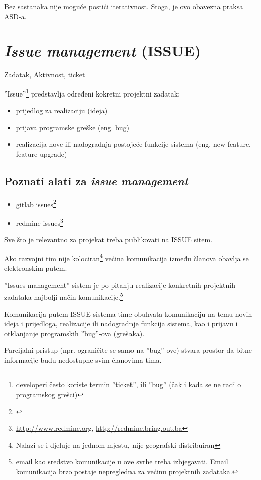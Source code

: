 \documentclass[lmodern, utf8, zavrsni]{fit}
\begin{document}
Bez sastanaka nije moguće postići iterativnost. Stoga, je ovo obavezna praksa ASD-a.

\section{\emph{Issue management} (ISSUE)}

Zadatak, Aktivnost, ticket

''Issue''\footnote{developeri često koriste termin ''ticket'', ili ''bug'' (čak i kada se ne radi o programskog grešci)} predstavlja određeni kokretni projektni zadatak:
\begin{itemize}
  \item prijedlog za realizaciju (ideja)
  \item prijava programske greške (eng. bug)
  \item realizacija nove ili nadogradnja postojeće funkcije sistema (eng. new feature, feature upgrade)
\end{itemize}

\subsection{Poznati alati za \emph{issue management}}

\begin{itemize}
  \item gitlab issues\footnote{\citep{agilegit}}
  \item redmine issues\footnote{\url{http://www.redmine.org}, \url{http://redmine.bring.out.ba}}
\end{itemize}

Sve što je relevantno za projekat treba publikovati na ISSUE sitem.

Ako razvojni tim nije kolociran\footnote{Nalazi se i djeluje na jednom mjestu, nije geografski distribuiran} većina komunikacija između članova obavlja se elektronskim putem.

''Issues management'' sistem je po pitanju realizacije konkretnih projektnih zadataka najbolji način komunikacije.\footnote{email kao sredstvo komunikacije u ove svrhe treba izbjegavati. Email komunikacija brzo postaje nepregledna za većinu projektnih zadataka.}

Komunikacija putem ISSUE sistema time obuhvata komunikaciju na temu novih ideja i prijedloga, realizacije ili nadogradnje funkcija sistema, kao i prijavu i otklanjanje programskih ''bug''-ova (grešaka).

Parcijalni pristup (npr. ograničite se samo na ''bug''-ove) stvara prostor da bitne informacije budu nedostupne svim članovima tima.
\end{document}
